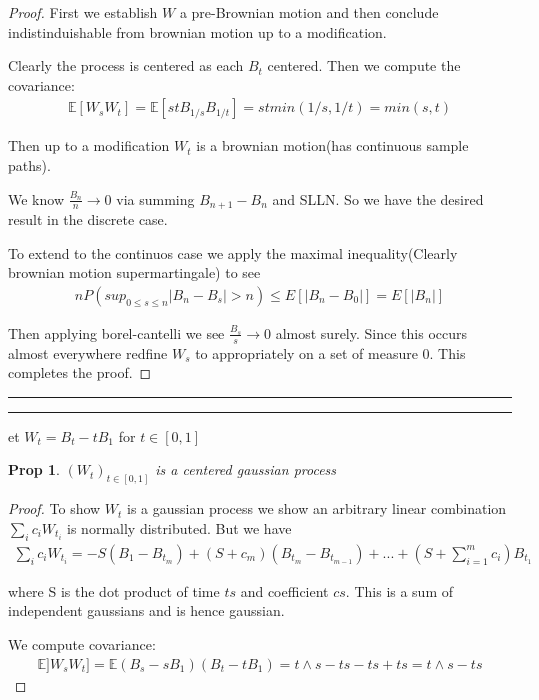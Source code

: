 \documentclass[11pt]{article}
\newcommand{\E}{\mathbb{E}}
\newcommand{\question}[2] {\vspace{.25in} \hrule\vspace{0.5em}
\noindent{\bf #1: #2} \vspace{0.5em}
\hrule \vspace{.10in}}
\newtheorem{prop}{Prop}
\begin{document}
\begin{proof}
	First we establish $W$ a pre-Brownian motion and then conclude indistinduishable from brownian motion up to a modification.

	Clearly the process is centered as each $B_t$ centered. Then we compute the covariance:
	\begin{align*}
		\E[W_s W_t] = \E[stB_{1/s}B_{1/t}] = st min(1/s,1/t) = min (s,t)
	\end{align*}

	Then up to a modification $W_t$ is a brownian motion(has continuous sample paths). 

	We know $\frac{B_n}{n} \to 0$ via summing $B_{n+1} - B_n$ and SLLN. So we have the desired result in the discrete case. 

	To extend to the continuos case we apply the maximal inequality(Clearly brownian motion supermartingale) to see
	\begin{align*}
		nP(sup_{0 \leq s\leq n}|B_n - B_s| > n) \leq E[|B_n - B_0|] = E[|B_n|]
	\end{align*}

	Then applying borel-cantelli we see $\frac{B_s}{s} \to 0$ almost surely. Since this occurs almost everywhere redfine $W_s$ to appropriately on a set of measure 0. This completes the proof.


\end{proof}

\question{Question 11}

Set $W_t = B_t - tB_1$ for $t \in [0,1]$

\begin{prop}
	$(W_t)_{t \in [0,1]}$ is a centered gaussian process
\end{prop}

\begin{proof}
	To show $W_t$ is a gaussian process we show an arbitrary linear combination $\sum_i c_i W_{t_i}$ is normally distributed. But we have
	\begin{align*}
		\sum_i c_i W_{t_i} = -S(B_1 - B_{t_m}) + (S + c_m)(B_{t_m} - B_{t_{m-1}}) + ... + (S + \sum_{i=1}^mc_i)B_{t_1}
	\end{align*}

	where S is the dot product of time $ts$ and coefficient $cs$. This is a sum of independent gaussians and is hence gaussian.

	We compute covariance:
	\begin{align*}
		\E]W_sW_t] = \E(B_s - sB_1)(B_t - tB_1) = t \wedge s - ts - ts + ts = t \wedge s - ts
	\end{align*}
\end{proof}
\end{document}
